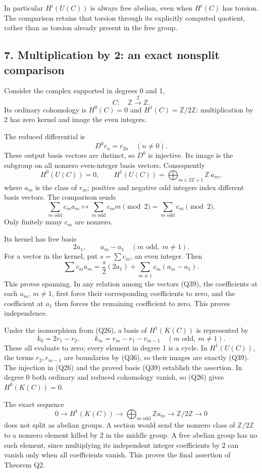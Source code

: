 \documentclass[
]{article}
\begin{document}
In particular \(H^i(U(C))\) is always free abelian, even when \(H^i(C)\)
has torsion. The comparison retains that torsion through its explicitly
computed quotient, rather than as torsion already present in the free
group.

\subsection{7. Multiplication by 2: an exact nonsplit
comparison}\label{multiplication-by-2-an-exact-nonsplit-comparison}

Consider the complex supported in degrees 0 and 1, \[
C:\quad\mathbb Z\xrightarrow{\,2\,}\mathbb Z.
\tag{Q35}
\] Its ordinary cohomology is \(H^0(C)=0\) and
\(H^1(C)=\mathbb Z/2\mathbb Z\): multiplication by 2 has zero kernel and
image the even integers.

The reduced differential is \[
D^0r_n=r_{2n}\quad(n\ne0).
\tag{Q36}
\] These output basis vectors are distinct, so \(D^0\) is injective. Its
image is the subgroup on all nonzero even-integer basis vectors.
Consequently \[
H^0(U(C))=0,
\qquad
H^1(U(C))=\bigoplus_{m\in2\mathbb Z+1}\mathbb Z\,a_m,
\tag{Q37}
\] where \(a_m\) is the class of \(r_m\); positive and negative odd
integers index different basis vectors. The comparison sends \[
\sum_{m\text{ odd}}c_m a_m
\longmapsto\sum_{m\text{ odd}}c_m m\pmod2
=\sum_{m\text{ odd}}c_m\pmod2.
\tag{Q38}
\] Only finitely many \(c_m\) are nonzero.

Its kernel has free basis \[
2a_1,\qquad a_m-a_1\quad(m\text{ odd},\ m\ne1).
\tag{Q39}
\] For a vector in the kernel, put \(s=\sum c_m\), an even integer. Then
\[
\sum c_m a_m=\frac{s}{2}(2a_1)
+\sum_{m\ne1}c_m(a_m-a_1).
\] This proves spanning. In any relation among the vectors (Q39), the
coefficients at each \(a_m\), \(m\ne1\), first force their corresponding
coefficients to zero, and the coefficient at \(a_1\) then forces the
remaining coefficient to zero. This proves independence.

Under the isomorphism from (Q26), a basis of \(H^1(K(C))\) is
represented by \[
k_0=2r_1-r_2,
\qquad
k_m=r_m-r_1-r_{m-1}\quad(m\text{ odd},\ m\ne1).
\tag{Q40}
\] These all evaluate to zero; every element in degree 1 is a cycle. In
\(H^1(U(C))\), the terms \(r_2,r_{m-1}\) are boundaries by (Q36), so
their images are exactly (Q39). The injection in (Q26) and the proved
basis (Q39) establish the assertion. In degree 0 both ordinary and
reduced cohomology vanish, so (Q26) gives \(H^0(K(C))=0\).

The exact sequence \[
0\to H^1(K(C))\to
\bigoplus_{m\text{ odd}}\mathbb Z a_m\to\mathbb Z/2\mathbb Z\to0
\tag{Q41}
\] does not split as abelian groups. A section would send the nonzero
class of \(\mathbb Z/2\mathbb Z\) to a nonzero element killed by 2 in
the middle group. A free abelian group has no such element, since
multiplying its independent integer coefficients by 2 can vanish only
when all coefficients vanish. This proves the final assertion of Theorem
Q2.
\end{document}
